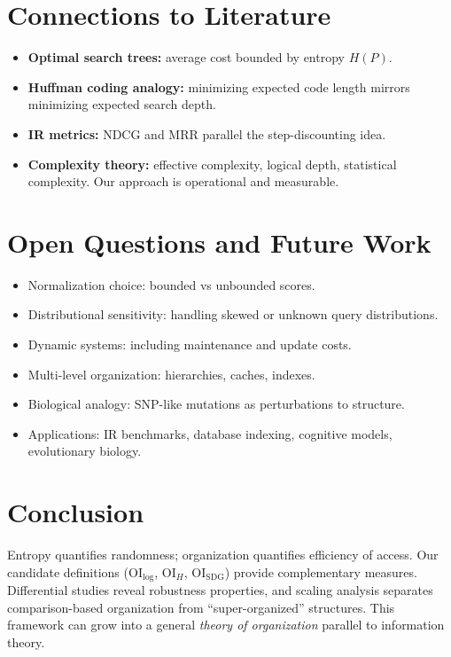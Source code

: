 \documentclass[11pt]{article}
\begin{document}
\section{Connections to Literature}
\begin{itemize}
  \item \textbf{Optimal search trees:} average cost bounded by entropy $H(P)$.
  \item \textbf{Huffman coding analogy:} minimizing expected code length mirrors
  minimizing expected search depth.
  \item \textbf{IR metrics:} NDCG and MRR parallel the step-discounting idea.
  \item \textbf{Complexity theory:} effective complexity, logical depth,
  statistical complexity. Our approach is operational and measurable.
\end{itemize}

\section{Open Questions and Future Work}
\begin{itemize}
  \item Normalization choice: bounded vs unbounded scores.
  \item Distributional sensitivity: handling skewed or unknown query
  distributions.
  \item Dynamic systems: including maintenance and update costs.
  \item Multi-level organization: hierarchies, caches, indexes.
  \item Biological analogy: SNP-like mutations as perturbations to structure.
  \item Applications: IR benchmarks, database indexing, cognitive models,
  evolutionary biology.
\end{itemize}

\section{Conclusion}
Entropy quantifies randomness; organization quantifies efficiency of access.
Our candidate definitions ($\mathrm{OI}_{\log}$, $\mathrm{OI}_H$,
$\mathrm{OI}_{\text{SDG}}$) provide complementary measures. Differential studies
reveal robustness properties, and scaling analysis separates comparison-based
organization from ``super-organized'' structures. This framework can grow into a
general \emph{theory of organization} parallel to information theory.


\end{document}
